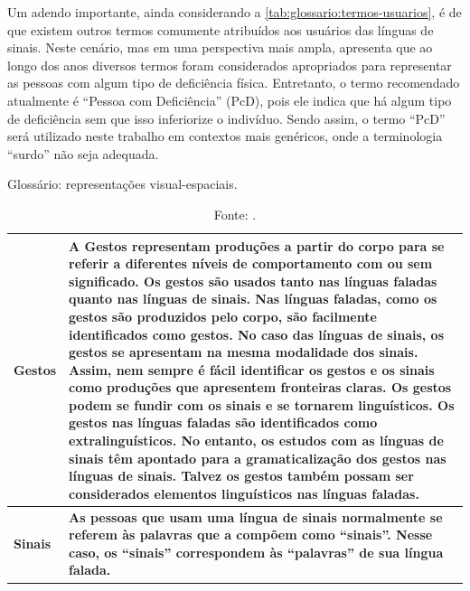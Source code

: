 Um adendo importante, ainda considerando a \autoref{tab:glossario:termos-usuarios}, é de que existem outros termos comumente atribuídos aos usuários das línguas de sinais. Neste cenário, mas em uma perspectiva mais ampla,  apresenta que ao longo dos anos diversos termos foram considerados apropriados para representar as pessoas com algum tipo de deficiência física. Entretanto, o termo recomendado atualmente é ``Pessoa com Deficiência'' (PcD), pois ele indica que há algum tipo de deficiência sem que isso inferiorize o indivíduo. Sendo assim, o termo ``PcD'' será utilizado neste trabalho em contextos mais genéricos, onde a terminologia ``surdo'' não seja adequada.

\begin{table}[htbp]
\caption{Glossário: representações visual-espaciais.}
\label{tab:glossario:representacoes-visual-espaciais}
\begin{tabularx}{\textwidth}{l|X} \hline
\textbf{Gestos} & \textbf{A Gestos representam produções a partir do corpo para se referir a diferentes níveis de comportamento com ou sem significado. Os gestos são usados tanto nas línguas faladas quanto nas línguas de sinais. Nas línguas faladas, como os gestos são produzidos pelo corpo, são facilmente identificados como gestos. No caso das línguas de sinais, os gestos se apresentam na mesma modalidade dos sinais. Assim, nem sempre é fácil identificar os gestos e os sinais como produções que apresentem fronteiras claras. Os gestos podem se fundir com os sinais e se tornarem linguísticos. Os gestos nas línguas faladas são identificados como extralinguísticos. No entanto, os estudos com as línguas de sinais têm apontado para a gramaticalização dos gestos nas línguas de sinais. Talvez os gestos também possam ser considerados elementos linguísticos nas línguas faladas.} \\ \hline
\textbf{Sinais} & \textbf{As pessoas que usam uma língua de sinais normalmente se referem às palavras que a compõem como ``sinais''. Nesse caso, os ``sinais'' correspondem às ``palavras'' de sua língua falada.} \\ \hline
\end{tabularx}
\caption*{Fonte: .}
\end{table}

